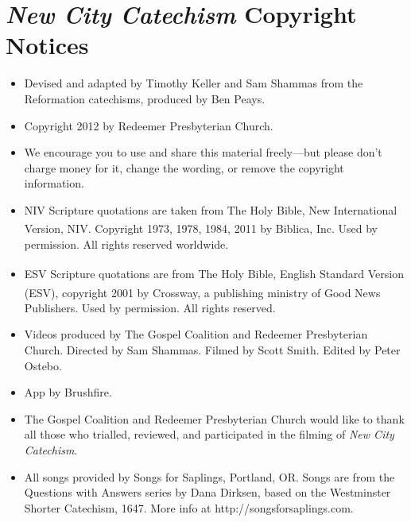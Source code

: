 \documentclass[]{memoir}
\begin{document}
\cleardoublepage

\section*{{\em New City Catechism}\/ Copyright Notices}

\begin{itemize}
	\item Devised and adapted by Timothy Keller and Sam Shammas from the Reformation catechisms, produced by Ben Peays.
	\item Copyright {\textcopyright} 2012 by Redeemer Presbyterian Church.
	\item We encourage you to use and share this material freely\thinspace{}---\thinspace{}but please don't charge money for it, change the wording, or remove the copyright information.
	\item NIV Scripture quotations are taken from The Holy Bible, New International Version,\textsuperscript{{\textregistered}} NIV\textsuperscript{{\textregistered}}. Copyright {\textcopyright} 1973, 1978, 1984, 2011 by Biblica, Inc.{\texttrademark} Used by permission. All rights reserved worldwide.
	\item ESV Scripture quotations are from The Holy Bible, English Standard Version\textsuperscript{{\textregistered}} (ESV\textsuperscript{{\textregistered}}), copyright {\textcopyright} 2001 by Crossway, a publishing ministry of Good News Publishers. Used by permission. All rights reserved.
	\item Videos produced by The Gospel Coalition and Redeemer Presbyterian Church. Directed by Sam Shammas. Filmed by Scott Smith. Edited by Peter Ostebo.
	\item App by Brushfire.
	\item The Gospel Coalition and Redeemer Presbyterian Church would like to thank all those who trialled, reviewed, and participated in the filming of {\em New City Catechism}.
	\item All songs provided by Songs for Saplings, Portland, OR. Songs are from the Questions with Answers series by Dana Dirksen, based on the Westminster Shorter Catechism, 1647. More info at http:\slash{}\slash{}songs\hspace{0em}for\hspace{0em}sap\hspace{0em}lings.com.
\end{itemize}

\cleardoublepage

\setcounter{tocdepth}{2}
\end{document}
